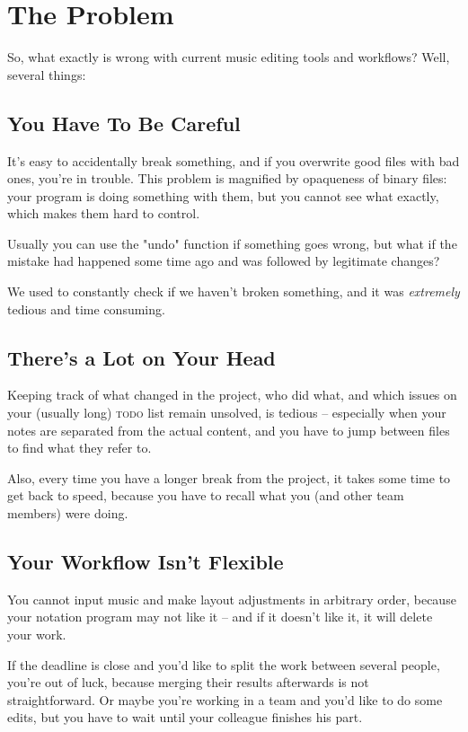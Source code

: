 \documentclass[11pt,a4paper]{article}
\begin{document}
\section{The Problem}
So, what exactly is wrong with current music editing tools and workflows?
Well, several things:

\subsection{You Have To Be Careful}
It's easy to accidentally break something, and if you overwrite good files
with bad ones, you're in trouble.  This problem is magnified by opaqueness
of binary files: your program is doing something with them,
but you cannot see what exactly, which makes them hard to control.

Usually you can use the "undo" function if something goes wrong,
but what if the mistake had happened some time ago and was followed by legitimate changes?

We used to constantly check if we haven't broken something,
and it was \emph{extremely} tedious and time consuming.

\subsection{There's a Lot on Your Head}
Keeping track of what changed in the project, who did what,
and which issues on your (usually long) \textsc{todo} list remain
unsolved, is tedious -- especially when your notes are separated from
the actual content, and you have to jump between files to find
what they refer to.

Also, every time you have a longer break from the project, it takes some
time to get back to speed, because you have to recall what you
(and other team members) were doing.

\subsection{Your Workflow Isn't Flexible}
You cannot input music and make layout adjustments in arbitrary order, because
your notation program may not like it -- and if it doesn't like it,
it will delete your work.

If the deadline is close and you'd like to split the work between several people,
you're out of luck, because merging their results afterwards is not straightforward.
Or maybe you're working in a team and you'd like to do some edits, but you have to wait
until your colleague finishes his part.
\end{document}
